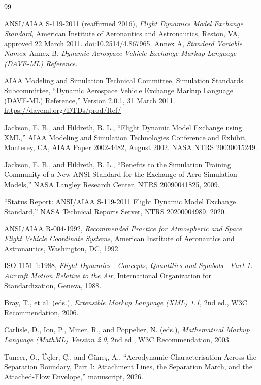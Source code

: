\documentclass[11pt,a4paper]{article}
\begin{document}
\begin{thebibliography}{99}

ANSI/AIAA S-119-2011 (reaffirmed 2016),
\emph{Flight Dynamics Model Exchange Standard},
American Institute of Aeronautics and Astronautics, Reston, VA, approved
22 March 2011. doi:10.2514/4.867965. Annex A, \emph{Standard Variable
Names}; Annex B, \emph{Dynamic Aerospace Vehicle Exchange Markup
Language (DAVE-ML) Reference}.

AIAA Modeling and Simulation Technical Committee, Simulation Standards
Subcommittee,
``Dynamic Aerospace Vehicle Exchange Markup Language (DAVE-ML)
Reference,'' Version 2.0.1, 31 March 2011.
\url{https://daveml.org/DTDs/prod/Ref/}

Jackson, E. B., and Hildreth, B. L.,
``Flight Dynamic Model Exchange using XML,''
AIAA Modeling and Simulation Technologies Conference and Exhibit,
Monterey, CA, AIAA Paper 2002-4482, August 2002.
NASA NTRS 20030015249.

Jackson, E. B., and Hildreth, B. L.,
``Benefits to the Simulation Training Community of a New ANSI Standard
for the Exchange of Aero Simulation Models,''
NASA Langley Research Center, NTRS 20090041825, 2009.

``Status Report: ANSI/AIAA S-119-2011 Flight Dynamic Model Exchange
Standard,'' NASA Technical Reports Server, NTRS 20200004989, 2020.

ANSI/AIAA R-004-1992,
\emph{Recommended Practice for Atmospheric and Space Flight Vehicle
Coordinate Systems},
American Institute of Aeronautics and Astronautics, Washington, DC,
1992.

ISO 1151-1:1988,
\emph{Flight Dynamics---Concepts, Quantities and Symbols---Part 1:
Aircraft Motion Relative to the Air},
International Organization for Standardization, Geneva, 1988.

Bray, T., et al. (eds.),
\emph{Extensible Markup Language (XML) 1.1}, 2nd ed.,
W3C Recommendation, 2006.

Carlisle, D., Ion, P., Miner, R., and Poppelier, N. (eds.),
\emph{Mathematical Markup Language (MathML) Version 2.0}, 2nd ed.,
W3C Recommendation, 2003.

Tuncer, O., \"U\c{c}ler, \c{C}., and G\"une\c{s}, A.,
``Aerodynamic Characterisation Across the Separation Boundary,
Part I: Attachment Lines, the Separation March, and the Attached-Flow
Envelope,'' manuscript, 2026.


\end{thebibliography}
\end{document}
